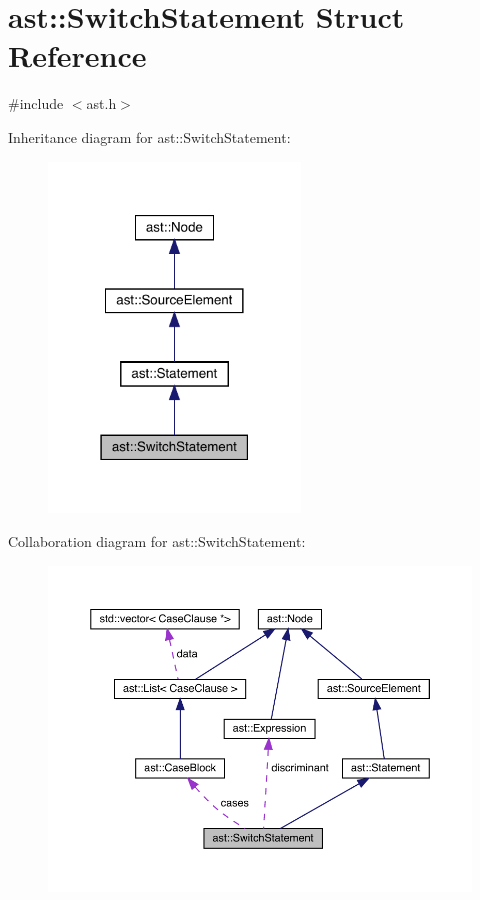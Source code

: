 \hypertarget{structast_1_1_switch_statement}{}\section{ast\+:\+:Switch\+Statement Struct Reference}
\label{structast_1_1_switch_statement}


{\ttfamily \#include $<$ast.\+h$>$}



Inheritance diagram for ast\+:\+:Switch\+Statement\+:
\nopagebreak
\begin{figure}[H]
\begin{center}
\leavevmode
\includegraphics[width=190pt]{structast_1_1_switch_statement__inherit__graph}
\end{center}
\end{figure}


Collaboration diagram for ast\+:\+:Switch\+Statement\+:
\nopagebreak
\begin{figure}[H]
\begin{center}
\leavevmode
\includegraphics[width=350pt]{structast_1_1_switch_statement__coll__graph}
\end{center}
\end{figure}
